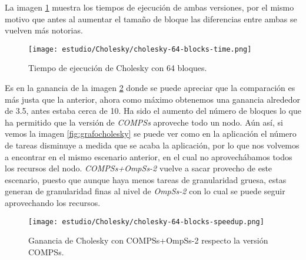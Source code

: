 La imagen \ref{fig:cholesky-64-time} muestra los tiempos de ejecución de ambas versiones, por el mismo motivo que antes al aumentar el tamaño de bloque las diferencias entre ambas se vuelven más notorias.

\par\bigskip

\begin{figure}[H]
	\centering 
	\caption{Tiempo de ejecución de Cholesky con 64 bloques.}
	\texttt{[image: estudio/Cholesky/cholesky-64-blocks-time.png]}
	\label{fig:cholesky-64-time}
\end{figure}

Es en la ganancia de la imagen \ref{fig:cholesky-64-speedup} donde se puede apreciar que la comparación es más justa que la anterior, ahora como máximo obtenemos una ganancia alrededor de 3.5, antes estaba cerca de 10. Ha sido el aumento del número de bloques lo que ha permitido que la versión de \textit{COMPSs} aproveche todo un nodo. Aún así, si vemos la imagen \ref{fig:grafocholesky} se puede ver como en la aplicación el número de tareas disminuye a medida que se acaba la aplicación, por lo que nos volvemos a encontrar en el mismo escenario anterior, en el cual no aprovechábamos todos los recursos del nodo. \textit{COMPSs+OmpSs-2} vuelve a sacar provecho de este escenario, puesto que aunque haya menos tareas de granularidad gruesa, estas generan de granularidad finas al nivel de \textit{OmpSs-2} con lo cual se puede seguir aprovechando los recursos.

\par\bigskip

\begin{figure}[H]
	\centering 
	\caption{Ganancia de Cholesky con COMPSs+OmpSs-2 respecto la versión COMPSs.}
	\texttt{[image: estudio/Cholesky/cholesky-64-blocks-speedup.png]}
	\label{fig:cholesky-64-speedup}
\end{figure}










